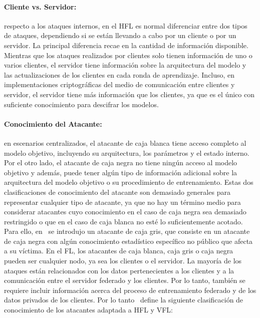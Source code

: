 \begin{itemize}
        \paragraph{Cliente vs. Servidor:} respecto a los ataques internos, en el \ac{HFL} es normal diferenciar entre dos tipos de ataques, dependiendo si se están llevando a cabo por un cliente o por un servidor. La principal diferencia recae en la cantidad de información disponible. Mientras que los ataques realizados por clientes solo tienen información de uno o varios clientes, el servidor tiene información sobre la arquitectura del modelo y las actualizaciones de los clientes en cada ronda de aprendizaje. Incluso, en implementaciones criptográficas del medio de comunicación entre clientes y servidor, el servidor tiene más información que los clientes, ya que es el único con suficiente conocimiento para descifrar los modelos.
        
        \paragraph{Conocimiento del Atacante:} en escenarios centralizados, el atacante de caja blanca tiene acceso completo al modelo objetivo, incluyendo su arquitectura, los parámetros y el estado interno. Por el otro lado, el atacante de caja negra no tiene ningún acceso al modelo objetivo y además, puede tener algún tipo de información adicional sobre la arquitectura del modelo objetivo o su procedimiento de entrenamiento. Estas dos clasificaciones de conocimiento del atacante son demasiado generales para representar cualquier tipo de atacante, ya que no hay un término medio para considerar atacantes cuyo conocimiento en el caso de caja negra sea demasiado restringido o que en el caso de caja blanca no esté lo suficientemente acotado. Para ello, en~\cite{truex-2021} se introdujo un atacante de caja gris, que consiste en un atacante de caja negra con algún conocimiento estadístico específico no público que afecta a su víctima. En el \ac{FL}, los atacantes de caja blanca, caja gris o caja negra pueden ser cualquier nodo, ya sea los clientes o el servidor. La mayoría de los ataques están relacionados con los datos pertenecientes a los clientes y a la comunicación entre el servidor federado y los clientes. Por lo tanto, también se requiere incluir información acerca del proceso de entrenamiento federado y de los datos privados de los clientes. Por lo tanto~\cite{survey-nuria-2023} define la siguiente clasificación de conocimiento de los atacantes adaptada a \ac{HFL} y \ac{VFL}:


\end{itemize}
